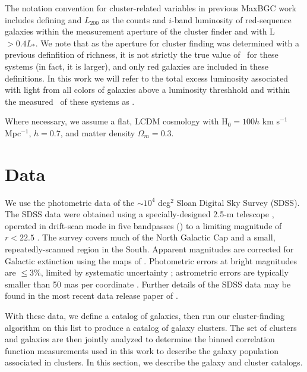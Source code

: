 \documentclass{emulateapj}
\begin{document}
The notation convention for cluster-related variables in previous MaxBGC work
includes defining \Ntwo and $L_{200}$ as the counts and $i$-band luminosity of
red-sequence galaxies within the measurement aperture of the cluster finder and
with L $> 0.4L_*$. We note that as the aperture for cluster finding was
determined with a previous definfition of richness, it is not strictly the true
value of \rtwo\ for these systems (in fact, it is larger), and only red
galaxies are included in these definitions. In this work we will refer to the
total excess luminosity associated with light from all colors of galaxies above
a luminosity threshhold and within the measured \rtwo\ of these systems as
\deltalvir.

Where necessary, we assume a flat, LCDM cosmology with H$_{0} = 100h$ km
s$^{-1}$ Mpc$^{-1}$, $h = 0.7$, and matter density $\Omega_m = 0.3$.

\section{Data} \label{sec:data}

We use the photometric data of the $\sim 10^4$ deg$^2$ Sloan Digital
Sky Survey (SDSS). The SDSS data were obtained using a
specially-designed 2.5-m telescope \citep{Gunn06}, operated in
drift-scan mode in five bandpasses (\ugriz) to a limiting magnitude of
$r<22.5$ \citep{Fukugita96, Gunn98, Lupton10, Hogg01, Smith02}. The
survey covers much of the North Galactic Cap and a small,
repeatedly-scanned region in the South. Apparent magnitudes are
corrected for Galactic extinction using the maps of
\citet{Schlegel98}. Photometric errors at bright magnitudes are $\le
3\%$, limited by systematic uncertainty \citep{Ivezic04}; astrometric
errors are typically smaller than 50 mas per coordinate
\citep{Pier03}. Further details of the SDSS data may be found in the
most recent data release paper of \citet{dr5}.

With these data, we define a catalog of galaxies, then run our
cluster-finding algorithm on this list to produce a catalog of galaxy
clusters. The set of clusters and galaxies are then jointly analyzed
to determine the binned correlation function measurements used in this
work to describe the galaxy population associated in clusters. In this
section, we describe the galaxy and cluster catalogs.
\end{document}
